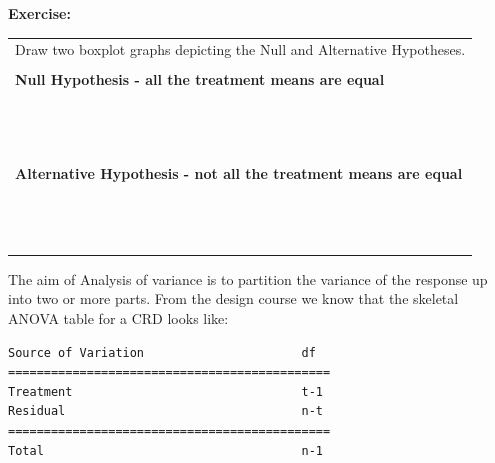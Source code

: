 \documentclass[a4paper, 10pt, fleqn, twosided]{memoir}
\begin{document}
\textbf{Exercise:}
\begin{table}[h]
\centering
\noindent\begin{tabular}{@{}*{1}{p{\textwidth}@{}}}
   \toprule
Draw two boxplot graphs depicting the Null and Alternative Hypotheses.
     \\
     \\
\textbf{Null Hypothesis - all the treatment means are equal}    \\
     \\
     \\
     \\
     \\
     \\
     \\
     \\
     \\
     \\
     \\
     \\
     \\
     \\
\textbf{Alternative Hypothesis - not all the treatment means are equal}    \\
     \\
     \\
     \\
     \\
     \\
     \\
     \\
     \\
     \\
     \\
     \\
     \\
     \\
\bottomrule
 \hline
\end{tabular}
\end{table}

\clearpage

The aim of Analysis of variance is to partition the variance of the response up into two or more parts. From the design
course we know that the skeletal ANOVA table for a CRD looks like:

\begin{verbatim}
Source of Variation                      df
=============================================
Treatment                                t-1
Residual                                 n-t
=============================================
Total                                    n-1
\end{verbatim}
\end{document}
